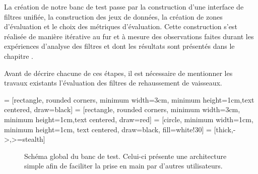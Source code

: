 La création de notre banc de test passe par la construction d'une interface de filtres unifiée, la construction des jeux de données, la création de zones d'évaluation et le choix des métriques d'évaluation. Cette construction s'est réalisée de manière itérative au fur et à mesure des observations faites durant les expériences d'analyse des filtres et dont les résultats sont présentés dans le chapitre \chapAnalysisN{}.

Avant de décrire chacune de ces étapes, il est nécessaire de mentionner les travaux existants l'évaluation des filtres de rehaussement de vaisseaux.

 = [rectangle, rounded corners, minimum width=3cm, minimum height=1cm,text centered, draw=black]
 = [rectangle, rounded corners, minimum width=3cm, minimum height=1cm,text centered, draw=red]
 = [circle, minimum width=1cm, minimum height=1cm, text centered, draw=black, fill=white!30]
 = [thick,->,>=stealth]

\begin{figure}[!ht]
  \centering
  \caption{Schéma global du banc de test. Celui-ci présente une architecture simple afin de faciliter la prise en main par d'autres utilisateurs.}
  \label{fig:schéma banc de test}
\end{figure}

